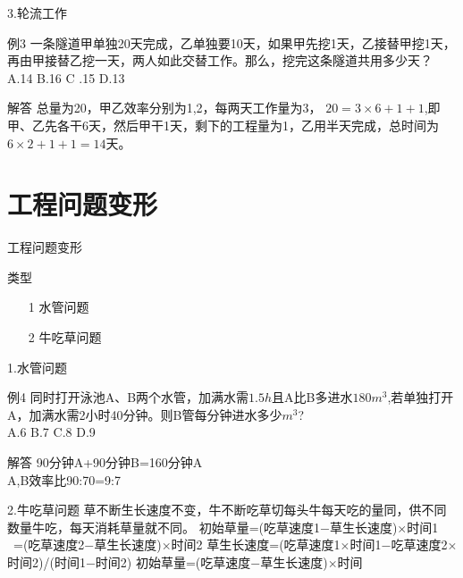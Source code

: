 \documentclass[10pt]{beamer}
\begin{document}
\begin{frame}{3.轮流工作}
\begin{block}{例3}
  一条隧道甲单独20天完成，乙单独要10天，如果甲先挖1天，乙接替甲挖1天，再由甲接替乙挖一天，两人如此交替工作。那么，挖完这条隧道共用多少天？\\
{\color{red}A.14}    \quad        B.16  \quad       C .15  \quad        D.13
\end{block}
\begin{alertblock}{解答}
总量为20，甲乙效率分别为1,2，每两天工作量为3，
$20=3\times6+1+1$,即 甲、乙先各干6天，然后甲干1天，剩下的工程量为1，乙用半天完成，总时间为$6\times2+1+1=14$天。

\end{alertblock}
\end{frame}

\section{工程问题变形}
\begin{frame}{工程问题变形}
\begin{block}{类型}
  \begin{itemize}
  \item[1] 水管问题
  \item[2] 牛吃草问题 
\end{itemize}
\end{block}
\end{frame}
\begin{frame}{1.水管问题}
\begin{block}{例4}
  同时打开泳池A、B两个水管，加满水需$1.5h$且A比B多进水$180m^3$,若单独打开A，加满水需2小时40分钟。则B管每分钟进水多少$m^3$?\\
   A.6  \quad  B.7  \quad  C.8  \quad D.9

\end{block}
\begin{alertblock}{解答}
90分钟A+90分钟B=160分钟A\\
A,B效率比90:70=9:7

\end{alertblock}
\end{frame}
\begin{frame}{2.牛吃草问题}
草不断生长速度不变，牛不断吃草切每头牛每天吃的量同，供不同数量牛吃，每天消耗草量就不同。
\newline
\newline
初始草量=(吃草速度1$-$草生长速度)$\times$时间1\\
 \quad \quad \quad \quad \      =(吃草速度2$-$草生长速度)$\times$时间2
\newline
\newline
草生长速度=(吃草速度1$\times$时间1$-$吃草速度2$\times$时间2)/(时间1$-$时间2)
\newline
\newline
初始草量=(吃草速度$-$草生长速度)$\times$时间
\end{frame}
\end{document}
